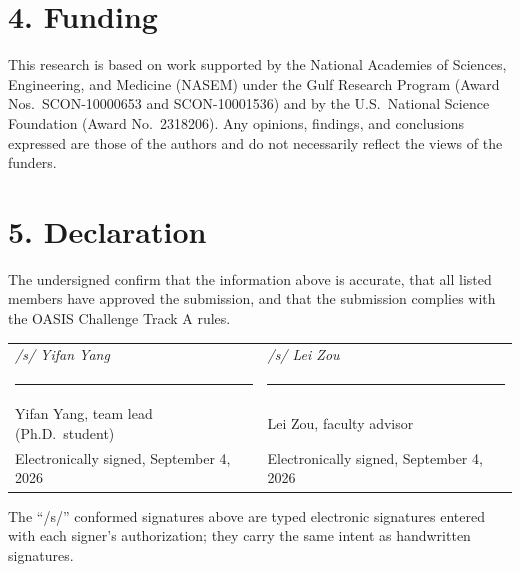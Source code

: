 \documentclass[10pt,letterpaper]{article}
\begin{document}
\section*{4. Funding}

This research is based on work supported by the National Academies of Sciences, Engineering, and Medicine (NASEM) under the Gulf Research Program (Award Nos.\ SCON-10000653 and SCON-10001536) and by the U.S.\ National Science Foundation (Award No.\ 2318206). Any opinions, findings, and conclusions expressed are those of the authors and do not necessarily reflect the views of the funders.

\section*{5. Declaration}

The undersigned confirm that the information above is accurate, that all listed members have approved the submission, and that the submission complies with the OASIS Challenge Track A rules.

\vspace{1.0em}
\noindent
\begin{tabular}{@{}p{3.1in}p{3.1in}@{}}
{\Large\itshape /s/ Yifan Yang} & {\Large\itshape /s/ Lei Zou} \\[0.3em]
\rule{2.8in}{0.4pt} & \rule{2.8in}{0.4pt} \\
Yifan Yang, team lead (Ph.D.\ student) & Lei Zou, faculty advisor \\
Electronically signed, September 4, 2026 & Electronically signed, September 4, 2026 \\
\end{tabular}

\vspace{0.6em}
{\small\noindent The ``/s/'' conformed signatures above are typed electronic signatures entered with each signer's authorization; they carry the same intent as handwritten signatures.}
\end{document}

